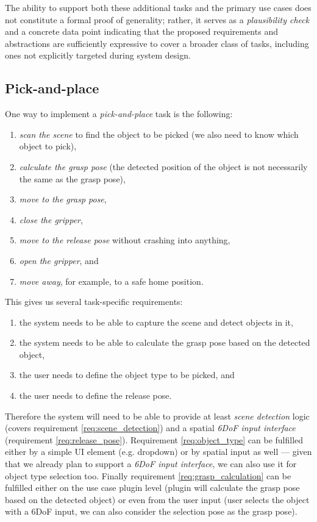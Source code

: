 The ability to support both these additional tasks and the primary use cases does not constitute a formal proof of generality; rather, it serves as a \emph{plausibility check} and a concrete data point indicating that the proposed requirements and abstractions are sufficiently expressive to cover a broader class of tasks, including ones not explicitly targeted during system design.

\subsection{Pick-and-place} \label{subsec:ch2_analysis_pick_and_place}

One way to implement a \emph{pick-and-place} task is the following:
\begin{enumerate}[label=(\arabic*), itemsep=0.2em]
    \item \emph{scan the scene} to find the object to be picked (we also need to know which object to pick),
    \item \emph{calculate the grasp pose} (the detected position of the object is not necessarily the same as the grasp pose),
    \item \emph{move to the grasp pose},
    \item \emph{close the gripper},
    \item \emph{move to the release pose} without crashing into anything,
    \item \emph{open the gripper}, and
    \item \emph{move away}, for example, to a safe home position.
\end{enumerate}

This gives us several task-specific requirements:
\begin{enumerate}[label=(\roman*), itemsep=0.2em]
    \item the system needs to be able to capture the scene and detect objects in it, \label{req:scene_detection}
    \item the system needs to be able to calculate the grasp pose based on the detected object, \label{req:grasp_calculation}
    \item the user needs to define the object type to be picked, and \label{req:object_type}
    \item the user needs to define the release pose. \label{req:release_pose}
\end{enumerate}

Therefore the system will need to be able to provide at least \emph{scene detection} logic (covers requirement \ref{req:scene_detection}) and a spatial \emph{6DoF input interface} (requirement \ref{req:release_pose}). Requirement \ref{req:object_type} can be fulfilled either by a simple UI element (e.g. dropdown) or by spatial input as well --- given that we already plan to support a \emph{6DoF input interface}, we can also use it for object type selection too. Finally requirement \ref{req:grasp_calculation} can be fulfilled either on the use case plugin level (plugin will calculate the grasp pose based on the detected object) or even from the user input (user selects the object with a 6DoF input, we can also consider the selection pose as the grasp pose).

